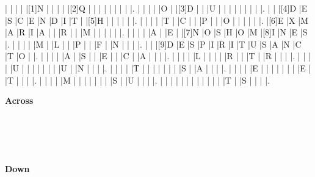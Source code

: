 \documentclass{article}
\begin{document}
\begin{Puzzle}{18}{15}
|{} |{} |{} |{} |[1]N |{} |{} |{} |{} |[2]Q |{} |{} |{} |{} |{} |{} |{} |{} |.
|{} |{} |{} |{} |O |{} |[3]D |{} |{} |U |{} |{} |{} |{} |{} |{} |{} |{} |.
|{} |{} |[4]D |E |S |C |E |N |D |I |T |{} |[5]H |{} |{} |{} |{} |{} |.
|{} |{} |{} |{} |T |{} |C |{} |{} |P |{} |{} |O |{} |{} |{} |{} |{} |.
|[6]E |X |M |A |R |I |A |{} |{} |R |{} |{} |M |{} |{} |{} |{} |{} |.
|{} |{} |{} |{} |A |{} |E |{} |[7]N |O |S |H |O |M |[8]I |N |E |S |.
|{} |{} |{} |{} |M |{} |L |{} |{} |P |{} |{} |F |{} |N |{} |{} |{} |.
|{} |{} |[9]D |E |S |P |I |R |I |T |U |S |A |N |C |T |O |{} |.
|{} |{} |{} |{} |A |{} |S |{} |{} |E |{} |{} |C |{} |A |{} |{} |{} |.
|{} |{} |{} |{} |L |{} |{} |{} |{} |R |{} |{} |T |{} |R |{} |{} |{} |.
|{} |{} |{} |{} |U |{} |{} |{} |{} |{} |{} |{} |U |{} |N |{} |{} |{} |.
|{} |{} |{} |{} |T |{} |{} |{} |{} |{} |{} |{} |S |{} |A |{} |{} |{} |.
|{} |{} |{} |{} |E |{} |{} |{} |{} |{} |{} |{} |E |{} |T |{} |{} |{} |.
|{} |{} |{} |{} |M |{} |{} |{} |{} |{} |{} |{} |S |{} |U |{} |{} |{} |.
|{} |{} |{} |{} |{} |{} |{} |{} |{} |{} |{} |{} |T |{} |S |{} |{} |{} |.
\end{Puzzle}

\begin{PuzzleClues}{\textbf{Across}}\\
\\
\\
\\
\\
\end{PuzzleClues}%
\begin{PuzzleClues}{\textbf{Down}}\\
\\
\\
\\
\\
\\
\end{PuzzleClues}
\end{document}
